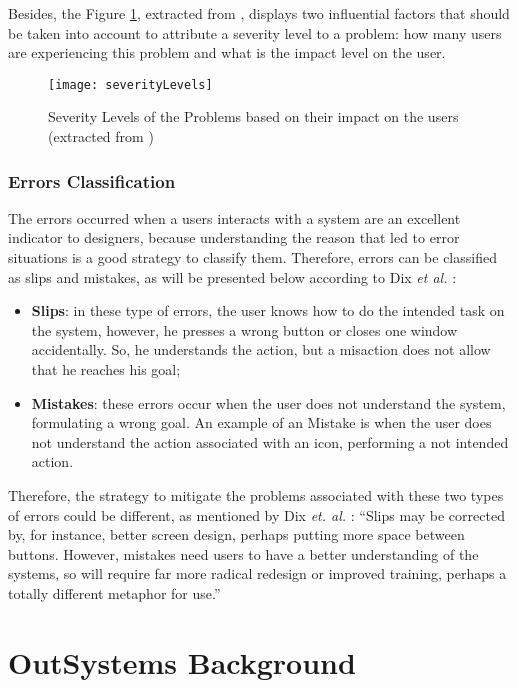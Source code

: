 Besides, the Figure \ref{fig:severityLevels}, extracted from \cite{usabilityEngineering}, displays two influential factors that should be taken into account to attribute a severity level to a problem: how many users are experiencing this problem and what is the impact level on the user.

\begin{figure}[htbp]
	\centering
	\texttt{[image: severityLevels]}
	\caption{Severity Levels of the Problems based on their impact on the users (extracted from \cite{usabilityEngineering})}
	\label{fig:severityLevels}
\end{figure}

\subsubsection{Errors Classification}
\label{subsubsec:errors_classification}
The errors occurred when a users interacts with a system are an excellent indicator to designers, because understanding the reason that led to error situations is a good strategy to classify them. Therefore, errors can be classified as slips and mistakes, as will be presented below according to Dix \textit{et al.} \cite{humanComputerInteraction}:

\begin{itemize}
	\item \textbf{Slips}: in these type of errors, the user knows how to do the intended task on the system, however, he presses a wrong button or closes one window accidentally. So, he understands the action, but a misaction does not allow that he reaches his goal;
	\item \textbf{Mistakes}: these errors occur when the user does not understand the system, formulating a wrong goal. An example of an Mistake is when the user does not understand the action associated with an icon, performing a not intended action.
\end{itemize}

Therefore, the strategy to mitigate the problems associated with these two types of errors could be different, as mentioned by Dix \textit{et. al.} \cite{humanComputerInteraction}: “Slips may be corrected by, for instance, better screen design, perhaps putting more space between buttons. However, mistakes need users to have a better understanding of the systems, so will require far more radical redesign or improved training, perhaps a totally different metaphor for use.”


\section{OutSystems Background}
\label{sec:outsystems_background}

